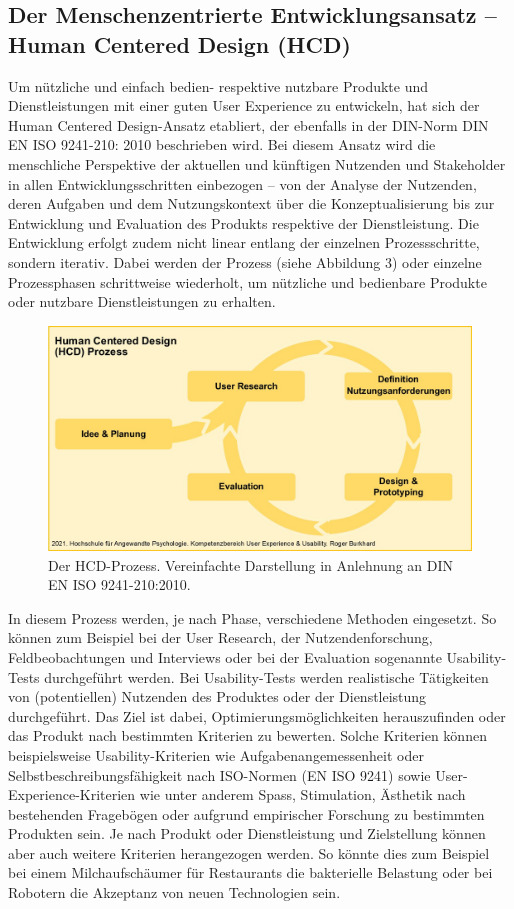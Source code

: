 \documentclass[a4paper,
fontsize=11pt,
oneside,
numbers=noperiodatend,
parskip=half-,
bibliography=totoc,
final
]{scrartcl}
\begin{document}
\hypertarget{der-menschenzentrierte-entwicklungsansatz-human-centered-design-hcd}{%
\subsection{Der Menschenzentrierte Entwicklungsansatz -- Human Centered Design (HCD)}\label{der-menschenzentrierte-entwicklungsansatz-human-centered-design-hcd}}

Um nützliche und einfach bedien- respektive nutzbare Produkte und
Dienstleistungen mit einer guten User Experience zu entwickeln, hat sich
der Human Centered Design-Ansatz etabliert, der ebenfalls in der
DIN-Norm DIN EN ISO 9241-210: 2010 beschrieben wird. Bei diesem Ansatz
wird die menschliche Perspektive der aktuellen und künftigen Nutzenden
und Stakeholder in allen Entwicklungsschritten einbezogen -- von der
Analyse der Nutzenden, deren Aufgaben und dem Nutzungskontext über die
Konzeptualisierung bis zur Entwicklung und Evaluation des Produkts
respektive der Dienstleistung. Die Entwicklung erfolgt zudem nicht
linear entlang der einzelnen Prozessschritte, sondern iterativ. Dabei
werden der Prozess (siehe Abbildung 3) oder einzelne Prozessphasen
schrittweise wiederholt, um nützliche und bedienbare Produkte oder
nutzbare Dienstleistungen zu erhalten.

\begin{figure}
\centering
\includegraphics[width=.8\textwidth]{img/HCD-Prozess.jpg}
\caption{Der HCD-Prozess. Vereinfachte Darstellung in
Anlehnung an DIN EN ISO 9241-210:2010.}
\end{figure}

In diesem Prozess werden, je nach Phase, verschiedene Methoden
eingesetzt. So können zum Beispiel bei der User Research, der
Nutzendenforschung, Feldbeobachtungen und Interviews oder bei der
Evaluation sogenannte Usability-Tests durchgeführt werden. Bei
Usability-Tests werden realistische Tätigkeiten von (potentiellen)
Nutzenden des Produktes oder der Dienstleistung durchgeführt. Das Ziel
ist dabei, Optimierungsmöglichkeiten herauszufinden oder das Produkt
nach bestimmten Kriterien zu bewerten. Solche Kriterien können
beispielsweise Usability-Kriterien wie Aufgabenangemessenheit oder
Selbstbeschreibungsfähigkeit nach ISO-Normen (EN ISO 9241) sowie
User-Experience-Kriterien wie unter anderem Spass, Stimulation, Ästhetik
nach bestehenden Fragebögen oder aufgrund empirischer Forschung zu
bestimmten Produkten sein. Je nach Produkt oder Dienstleistung und
Zielstellung können aber auch weitere Kriterien herangezogen werden. So
könnte dies zum Beispiel bei einem Milchaufschäumer für Restaurants die
bakterielle Belastung oder bei Robotern die Akzeptanz von neuen
Technologien sein.
\end{document}
